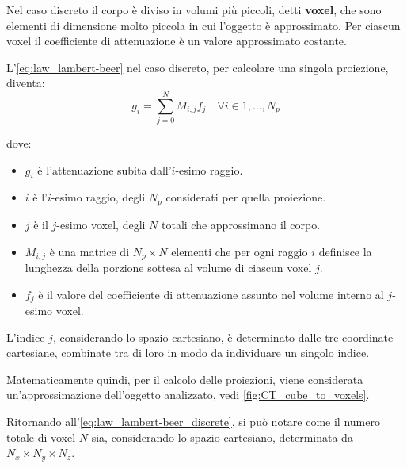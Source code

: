 \documentclass[12pt,a4paper]{report}
\begin{document}
Nel caso discreto il corpo è diviso in volumi più piccoli, detti \textbf{voxel}, che sono elementi di dimensione molto piccola in
cui l'oggetto è approssimato.
Per ciascun voxel il coefficiente di attenuazione è un valore approssimato costante.

L'\autoref{eq:law_lambert-beer} nel caso discreto, per calcolare una singola proiezione, diventa:
\begin{equation} \label{eq:law_lambert-beer_discrete}
  g_i = \sum_{j=0}^N M_{i, j} f_j \quad \forall i \in 1, \dots, N_p
\end{equation}

dove:
\begin{itemize}
  \item \(g_i\) è l'attenuazione subita dall'\(i\)-esimo raggio.
  \item \(i\) è l'\(i\)-esimo raggio, degli \(N_p\) considerati per quella proiezione.
  \item \(j\) è il \(j\)-esimo voxel, degli \(N\) totali che approssimano il corpo.
  \item \(M_{i,j}\) è una matrice di \(N_p \times N\) elementi che per ogni raggio \(i\) definisce la lunghezza della porzione
        sottesa al volume di ciascun voxel \(j\).
  \item \(f_j\) è il valore del coefficiente di attenuazione assunto nel volume interno al \(j\)-esimo voxel.
\end{itemize}

L'indice \(j\), considerando lo spazio cartesiano, è determinato dalle tre coordinate cartesiane, combinate tra di loro in modo da
individuare un singolo indice.

Matematicamente quindi, per il calcolo delle proiezioni, viene considerata un'approssimazione dell'oggetto analizzato, vedi
\autoref{fig:CT_cube_to_voxels}.

Ritornando all'\autoref{eq:law_lambert-beer_discrete}, si può notare come il numero totale di voxel \(N\) sia, considerando lo
spazio cartesiano, determinata da \(N_x \times N_y \times N_z\).
\end{document}
